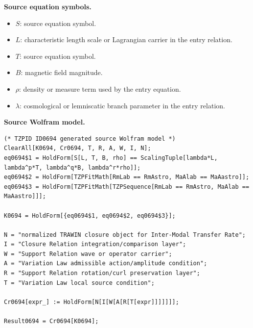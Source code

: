 \begin{minipage}[t]{0.49\linewidth}
\begingroup
\small
\raggedright
\textbf{Source equation symbols.}\par
\begin{itemize}[leftmargin=1.35em,itemsep=1pt,topsep=1pt,parsep=0pt]
    \item $S$: source equation symbol.
    \item $L$: characteristic length scale or Lagrangian carrier in the entry relation.
    \item $T$: source equation symbol.
    \item $B$: magnetic field magnitude.
    \item $\rho$: density or measure term used by the entry equation.
    \item $\lambda$: cosmological or lemniscatic branch parameter in the entry relation.
\end{itemize}
\endgroup
\end{minipage}\hfill
\begin{minipage}[t]{0.47\linewidth}
\begingroup
\scriptsize
\raggedright
\textbf{Source Wolfram model.}\par
\begin{Verbatim}[fontsize=\tiny,breaklines=true,breakanywhere=true]
(* TZPID ID0694 generated source Wolfram model *)
ClearAll[K0694, Cr0694, T, R, A, W, I, N];
eq0694$1 = HoldForm[S[L, T, B, rho] == ScalingTuple[lambda*L, lambda^p*T, lambda^q*B, lambda^r*rho]];
eq0694$2 = HoldForm[TZPFitMath[RmLab == RmAstro, MaAlab == MaAastro]];
eq0694$3 = HoldForm[TZPFitMath[TZPSequence[RmLab == RmAstro, MaAlab == MaAastro]]];

K0694 = HoldForm[{eq0694$1, eq0694$2, eq0694$3}];

N = "normalized TRAWIN closure object for Inter-Modal Transfer Rate";
I = "Closure Relation integration/comparison layer";
W = "Support Relation wave or operator carrier";
A = "Variation Law admissible action/amplitude condition";
R = "Support Relation rotation/curl preservation layer";
T = "Variation Law local source condition";

Cr0694[expr_] := HoldForm[N[I[W[A[R[T[expr]]]]]]];

Result0694 = Cr0694[K0694];
\end{Verbatim}
\endgroup
\end{minipage}

